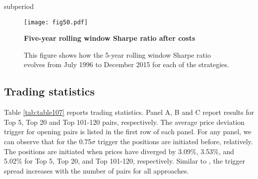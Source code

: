 \documentclass[a4paper]{article}
\begin{document}
subperiod


\begin{figure}[H]
\centering
\texttt{[image: fig50.pdf]}
\caption{\textbf{Five-year rolling window Sharpe ratio after costs}}
\caption*{\scriptsize This figure shows how the 5-year rolling window Sharpe ratio evolves from July 1996 to December 2015 for each of the strategies.}
\label{fig:fig50}
\end{figure}




	
	\vspace{0.3cm}
	
	


	
	\vspace{0.3cm}
	
	\subsection{Trading statistics}
	
	Table \ref{tab:table107} reports trading statistics. Panel A, B and C report results for Top 5, Top 20 and Top 101-120 pairs, respectively. The average price deviation trigger for opening pairs is listed in the first row of each panel. For any panel, we can observe that for the 0.75$\sigma$ trigger the positions are initiated before, relatively. The positions are initiated when prices have diverged by 3.09\%, 3.53\%, and 5.02\% for Top 5, Top 20, and Top 101-120, respectively. Similar to \citet*{ggr06}, the trigger spread increases with the number of pairs for all approaches.
	
\end{document}
